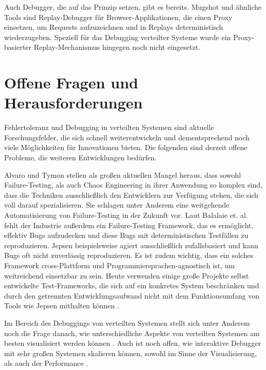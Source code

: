 \documentclass[12pt,a4paper]{report}
\begin{document}
Auch Debugger, die auf das Prinzip setzen, gibt es bereits. Mugshot \cite{mugshot_js_replay_proxy} und ähnliche Tools
\cite{mahimahi_http_replay} sind Replay-Debugger für Browser-Applikationen, die einen Proxy einsetzen, um Requests aufzuzeichnen
und in Replays deterministisch wiederzugeben. Speziell für das Debugging verteilter Systeme wurde ein Proxy-basierter
Replay-Mechanismus hingegen noch nicht eingesetzt.

\section{Offene Fragen und Herausforderungen}
\label{chap:hypothesis}
Fehlertoleranz und Debugging in verteilten Systemen sind aktuelle Forschungsfelder, die sich schnell weiterentwickeln und
dementsprechend noch viele Möglichkeiten für Innovationen bieten. Die folgenden sind derzeit offene Probleme, die weiteren
Entwicklungen bedürfen.

Alvaro und Tymon \cite{abstracting_the_geniuses} stellen als großen aktuellen Mangel heraus, dass sowohl Failure-Testing, als auch
Chaos Engineering in ihrer Anwendung so komplex sind, dass die Techniken ausschließlich den Entwicklern zur Verfügung stehen, die
sich voll darauf spezialisieren. Sie schlagen unter Anderem eine weitgehende Automatisierung von Failure-Testing in der Zukunft
vor. Laut Balalaie et. al. \cite{failify_masters_thesis} fehlt der Industrie außerdem ein Failure-Testing Framework, das es
ermöglicht, effektiv Bugs aufzudecken und diese Bugs mit deterministischen Testfällen zu reproduzieren. Jepsen beispielsweise
agiert ausschließlich zufallsbasiert und kann Bugs oft nicht zuverlässig reproduzieren. Es ist zudem wichtig, dass ein solches
Framework cross-Plattform und Programmiersprachen-agnostisch ist, um weitreichend einsetzbar zu sein. Heute verwenden einige große
Projekte selbst entwickelte Test-Frameworks, die sich auf ein konkretes System beschränken und durch den getrennten
Entwicklungsaufwand nicht mit dem Funktionsumfang von Tools wie Jepsen mithalten können \cite{failify_masters_thesis}.

Im Bereich des Debuggings von verteilten Systemen stellt sich unter Anderem noch die Frage danach, wie unterschiedliche Aspekte
von verteilten Systemen am besten visualisiert werden können \cite{oddity_graphical_debugger}. Auch ist noch offen, wie
interaktive Debugger mit sehr großen Systemen skalieren können, sowohl im Sinne der Visualisierung, als auch der Performance
\cite{gotcha_interactive_debugger}.
\end{document}
